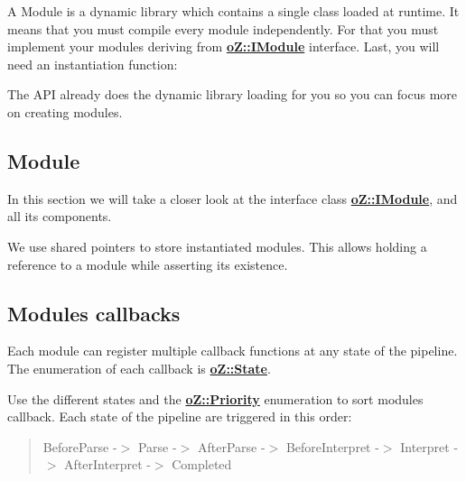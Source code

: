 A Module is a dynamic library which contains a single class loaded at runtime. It means that you must compile every module independently. For that you must implement your modules deriving from {\bfseries{\mbox{\hyperlink{classo_z_1_1_i_module}{o\+Z\+::\+I\+Module}}}} interface. Last, you will need an instantiation function\+: 
\begin{DoxyCode}{0}
\DoxyCodeLine{}
\end{DoxyCode}
 The A\+PI already does the dynamic library loading for you so you can focus more on creating modules.

\subsection*{Module}

In this section we will take a closer look at the interface class {\bfseries{\mbox{\hyperlink{classo_z_1_1_i_module}{o\+Z\+::\+I\+Module}}}}, and all its components. 
\begin{DoxyCode}{0}
\end{DoxyCode}
 We use shared pointers to store instantiated modules. This allows holding a reference to a module while asserting its existence.

\subsection*{Modules callbacks}

Each module can register multiple callback functions at any state of the pipeline. The enumeration of each callback is {\bfseries{\mbox{\hyperlink{namespaceo_z_a356b278f7c65def0cae75fca8cae268e}{o\+Z\+::\+State}}}}.

Use the different states and the {\bfseries{\mbox{\hyperlink{namespaceo_z_af05a92eb185d18369e9b4acdcd9dcd12}{o\+Z\+::\+Priority}}}} enumeration to sort modules callback. Each state of the pipeline are triggered in this order\+: \begin{quote}
Before\+Parse -\/$>$ Parse -\/$>$ After\+Parse -\/$>$ Before\+Interpret -\/$>$ Interpret -\/$>$ After\+Interpret -\/$>$ Completed \end{quote}


